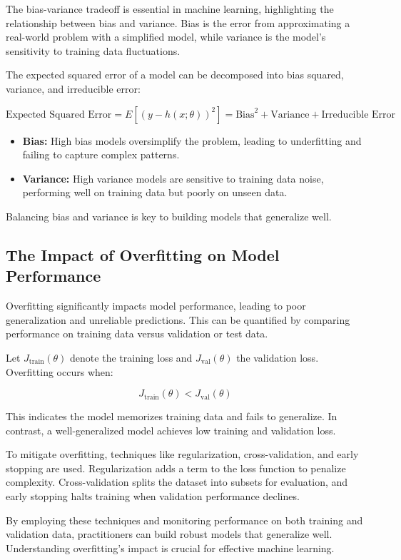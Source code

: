 \documentclass[12pt]{book} %
\begin{document}
The bias-variance tradeoff is essential in machine learning, highlighting the relationship between bias and variance. Bias is the error from approximating a real-world problem with a simplified model, while variance is the model's sensitivity to training data fluctuations.

The expected squared error of a model can be decomposed into bias squared, variance, and irreducible error:

\[
\text{Expected Squared Error} = E[(y - h(x; \theta))^2] = \text{Bias}^2 + \text{Variance} + \text{Irreducible Error}
\]

\begin{itemize}
    \item \textbf{Bias:} High bias models oversimplify the problem, leading to underfitting and failing to capture complex patterns.
    \item \textbf{Variance:} High variance models are sensitive to training data noise, performing well on training data but poorly on unseen data.
\end{itemize}

Balancing bias and variance is key to building models that generalize well.

\subsection{The Impact of Overfitting on Model Performance}

Overfitting significantly impacts model performance, leading to poor generalization and unreliable predictions. This can be quantified by comparing performance on training data versus validation or test data.

Let \( J_{\text{train}}(\theta) \) denote the training loss and \( J_{\text{val}}(\theta) \) the validation loss. Overfitting occurs when:

\[ J_{\text{train}}(\theta) < J_{\text{val}}(\theta) \]

This indicates the model memorizes training data and fails to generalize. In contrast, a well-generalized model achieves low training and validation loss.

To mitigate overfitting, techniques like regularization, cross-validation, and early stopping are used. Regularization adds a term to the loss function to penalize complexity. Cross-validation splits the dataset into subsets for evaluation, and early stopping halts training when validation performance declines.

By employing these techniques and monitoring performance on both training and validation data, practitioners can build robust models that generalize well. Understanding overfitting's impact is crucial for effective machine learning.
\end{document}
